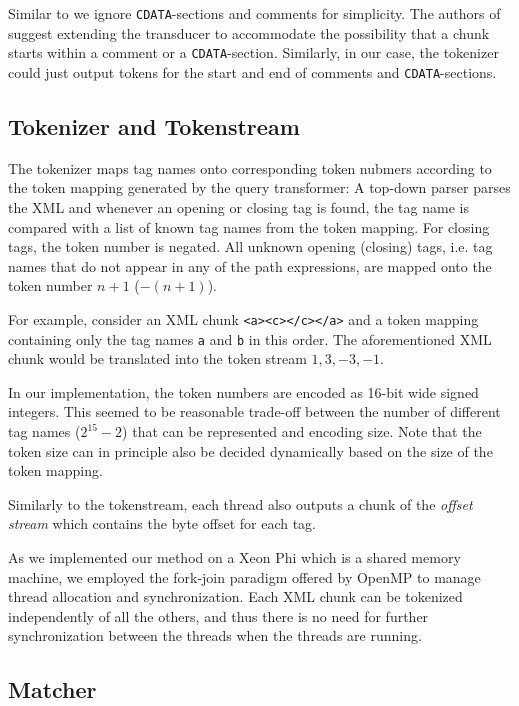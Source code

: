 Similar to  we ignore \texttt{CDATA}-sections and comments for
simplicity. The authors of  suggest extending the transducer to
accommodate the possibility that a chunk starts within a comment or a
\texttt{CDATA}-section. Similarly, in our case, the tokenizer could just output
tokens for the start and end of comments and \texttt{CDATA}-sections.

\subsection{Tokenizer and Tokenstream}

The tokenizer maps tag names onto corresponding token nubmers according to the
token mapping generated by the query transformer: A top-down parser parses the
XML and whenever an opening or closing tag is found, the tag name is compared
with a list of known tag names from the token mapping. For closing tags, the
token number is negated. All unknown opening (closing) tags, i.e. tag names that
do not appear in any of the path expressions, are mapped onto the token number
$n+1$ ($-(n+1)$).

For example, consider an XML chunk \verb;<a><c></c></a>; and a token mapping
containing only the tag names \verb;a; and \verb;b; in this order. The
aforementioned XML chunk would be translated into the token stream $1, 3, -3,
-1$.

In our implementation, the token numbers are encoded as 16-bit wide signed
integers. This seemed to be reasonable trade-off between the number of different
tag names ($2^{15}-2$) that can be represented and encoding size. Note that the
token size can in principle also be decided dynamically based on the size of the
token mapping.

Similarly to the tokenstream, each thread also outputs a chunk of the
\emph{offset stream} which contains the byte offset for each tag. 

As we implemented our method on a Xeon Phi  which is a
shared memory machine, we employed the fork-join paradigm offered by OpenMP
 to manage thread allocation and synchronization. Each XML chunk
can be tokenized independently of all the others, and thus there is no need for
further synchronization between the threads when the threads are running.

\subsection{Matcher}

